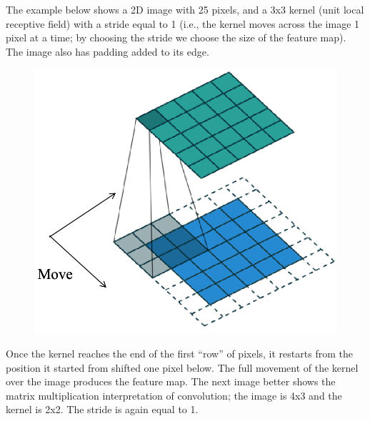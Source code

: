 The example below shows a 2D image with 25 pixels, and a 3x3 kernel (unit local receptive field) with a stride equal to 1 (i.e., the kernel moves across the image 1 pixel at a time; by choosing the stride we choose the size of the feature map). The image also has padding added to its edge.
\begin{figure}[ht]
    \centering
    \includegraphics[width=0.6\linewidth]{img/CNN_2D.png} 
\end{figure}

Once the kernel reaches the end of the first ``row'' of pixels, it restarts from the position it started from shifted one pixel below. The full movement of the kernel over the image produces the feature map. The next image better shows the matrix multiplication interpretation of convolution; the image is 4x3 and the kernel is 2x2. The stride is again equal to 1.

